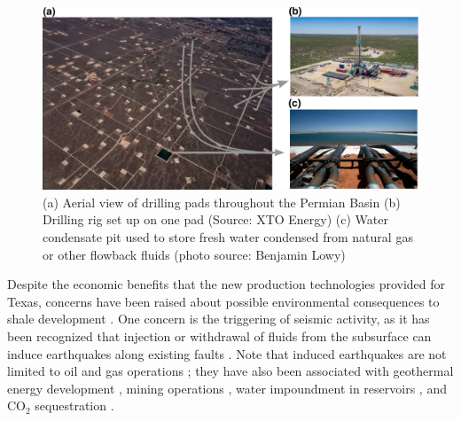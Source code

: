 \begin{figure}
	\centering
	\includegraphics[width=\linewidth]{figures/chapter3-permian/permian-images.pdf}
	\caption[Permian Basin drilling pads]{
		(a) Aerial view of drilling pads throughout the Permian Basin
		(b) Drilling rig set up on one pad
		(Source: XTO Energy)
		(c) Water condensate pit used to store fresh water condensed from natural gas or other flowback fluids (photo source: Benjamin Lowy)
	}
	\label{fig:ch3-drilling-pads}
\end{figure}


Despite the economic benefits that the new production technologies provided for Texas, concerns have been raised about possible environmental consequences to shale development \citep{TheAcademyofMedicine2017EnvironmentalCommunityImpacts, Scanlon2020WillWaterIssues}. 
One concern is the triggering of seismic activity, as it has been recognized that injection or withdrawal of fluids from the subsurface can induce earthquakes along existing faults \citep{Ellsworth2013InjectionInducedEarthquakes, Simpson1988TwoTypesReservoir}.
Note that induced earthquakes are not limited to oil and gas operations \citep{Grigoli2017CurrentChallengesMonitoring, Foulger2018GlobalReviewHuman, Baan2017HumanInducedSeismicity}; they have also been associated with geothermal energy development \citep{Deichmann2009EarthquakesInducedStimulation}, mining operations \citep{Hasegawa1989InducedSeismicityMines}, water impoundment in reservoirs \citep{Talwani1997NatureReservoirInduced}, and CO$_2$ sequestration \citep{Gan2013GasInjectionMay}.



